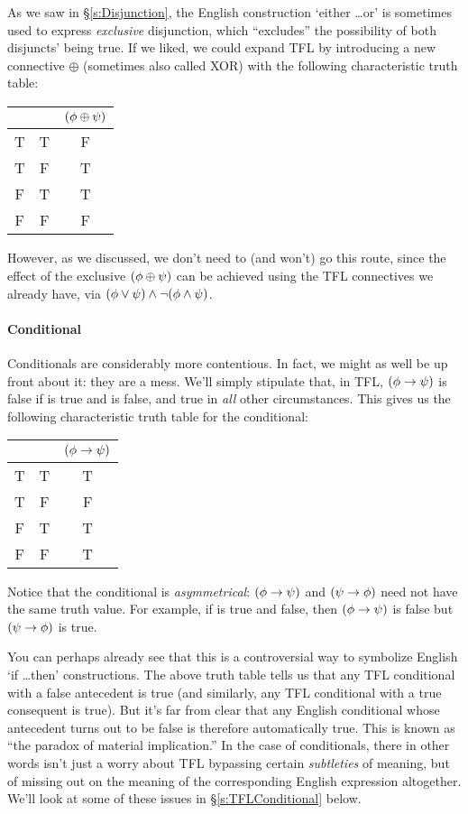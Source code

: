 As we saw in \S\ref{s:Disjunction}, the English construction `either \ldots or' is sometimes used to express \emph{exclusive} disjunction, which ``excludes'' the possibility of both disjuncts' being true.  If we liked, we could expand TFL by introducing a new connective $\oplus$ (sometimes also called XOR) with the following characteristic truth table:
\begin{center}
\begin{tabular}{c c|c}
\meta{\phi} & \meta{\psi} & $(\mathcal{\phi}\oplus\mathcal{\psi})$ \\
\hline
T & T & F\\
T & F & T\\
F & T & T\\
F & F & F
\end{tabular}
\end{center}
However, as we discussed, we don't need to  (and won't) go this route, since the effect of the exclusive $(\mathcal{\phi} \oplus \mathcal{\psi})$ can be achieved using the TFL connectives we already have, via $(\mathcal{\phi} \vee \mathcal{\psi}) \wedge \neg(\mathcal{\phi} \wedge \mathcal{\psi})$.

\paragraph{Conditional} Conditionals are considerably more contentious.  In fact, we might as well be up front about it: they are a mess.   We'll simply stipulate that, in TFL,  $(\mathcal{\phi}\rightarrow\mathcal{\psi})$ is false if \meta{\phi} is true and \meta{\psi} is false, and true in \emph{all} other circumstances. This gives us the following characteristic truth table for the conditional:
\begin{center}
\begin{tabular}{c c|c}
\meta{\phi} & \meta{\psi} & $(\mathcal{\phi}\rightarrow\mathcal{\psi})$\\
\hline
T & T & T\\
T & F & F\\
F & T & T\\
F & F & T
\end{tabular}
\end{center}
Notice that the conditional is \emph{asymmetrical}: $(\mathcal{\phi}\rightarrow\mathcal{\psi})$ and $(\mathcal{\psi} \rightarrow \mathcal{\phi})$ need not have the same truth value.  For example, if \meta{\phi} is true and \meta{\psi} false, then $(\mathcal{\phi}\rightarrow\mathcal{\psi})$ is false but $(\mathcal{\psi} \rightarrow \mathcal{\phi})$ is true.

You can perhaps already see that this is a controversial way to symbolize English `if \ldots then' constructions.  The above truth table tells us that any TFL conditional with a false antecedent is true (and similarly, any TFL conditional with a true consequent is true).  But it's far from clear that any English conditional whose antecedent turns out to be false is therefore automatically true.  This is known as ``the paradox of material implication.'' In the case of conditionals, there in other words isn't just a worry about TFL bypassing certain \emph{subtleties} of meaning, but of missing out on the meaning of the corresponding English expression altogether.   We'll look at some of these issues in \S\ref{s:TFLConditional} below.


